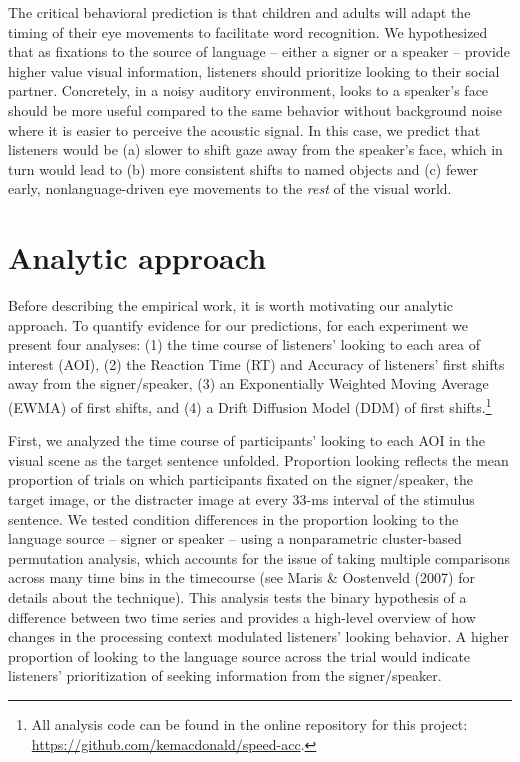 \documentclass[oneside]{report}
\begin{document}
The critical behavioral prediction is that children and adults will
adapt the timing of their eye movements to facilitate word recognition.
We hypothesized that as fixations to the source of language -- either a
signer or a speaker -- provide higher value visual information,
listeners should prioritize looking to their social partner. Concretely,
in a noisy auditory environment, looks to a speaker's face should be
more useful compared to the same behavior without background noise where
it is easier to perceive the acoustic signal. In this case, we predict
that listeners would be (a) slower to shift gaze away from the speaker's
face, which in turn would lead to (b) more consistent shifts to named
objects and (c) fewer early, nonlanguage-driven eye movements to the
\emph{rest} of the visual world.

\section{Analytic approach}\label{analytic-approach}

Before describing the empirical work, it is worth motivating our
analytic approach. To quantify evidence for our predictions, for each
experiment we present four analyses: (1) the time course of listeners'
looking to each area of interest (AOI), (2) the Reaction Time (RT) and
Accuracy of listeners' first shifts away from the signer/speaker, (3) an
Exponentially Weighted Moving Average (EWMA) of first shifts, and (4) a
Drift Diffusion Model (DDM) of first shifts.\footnote{All analysis code
  can be found in the online repository for this project:
  \url{https://github.com/kemacdonald/speed-acc}.}

First, we analyzed the time course of participants' looking to each AOI
in the visual scene as the target sentence unfolded. Proportion looking
reflects the mean proportion of trials on which participants fixated on
the signer/speaker, the target image, or the distracter image at every
33-ms interval of the stimulus sentence. We tested condition differences
in the proportion looking to the language source -- signer or speaker --
using a nonparametric cluster-based permutation analysis, which accounts
for the issue of taking multiple comparisons across many time bins in
the timecourse (see Maris \& Oostenveld (2007) for details about the
technique). This analysis tests the binary hypothesis of a difference
between two time series and provides a high-level overview of how
changes in the processing context modulated listeners' looking behavior.
A higher proportion of looking to the language source across the trial
would indicate listeners' prioritization of seeking information from the
signer/speaker.
\end{document}
